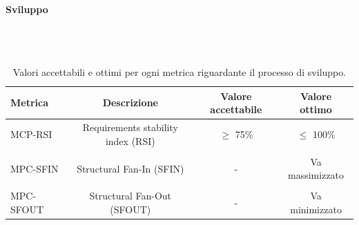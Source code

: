 \documentclass[8pt]{article}
\newcommand{\subsubsubsection}[1]{\paragraph{#1}\mbox{}\\\\}
\begin{document}
\clearpage
\subsubsubsection{Sviluppo}
\begin{table}[h]	
	\centering
	\begin{tabular}{lccc}
		\toprule
		\textbf{Metrica}& \textbf{Descrizione} & \textbf{Valore accettabile} & \textbf{Valore ottimo} \\
		\midrule
		MCP-RSI & Requirements stability index (RSI) & $\geq $ 75\%  & $\leq$ 100\% \\\\
		MPC-SFIN & Structural Fan-In (SFIN) & - & Va massimizzato\\\\
		MPC-SFOUT & Structural Fan-Out (SFOUT) & - & Va minimizzato\\
		\bottomrule
	\end{tabular}
	\caption{Valori accettabili e ottimi per ogni metrica riguardante il processo di sviluppo.}
	\label{table:Valori accettabili e ottimi per ogni metrica riguardante il processo di sviluppo.}
\end{table}
\end{document}
